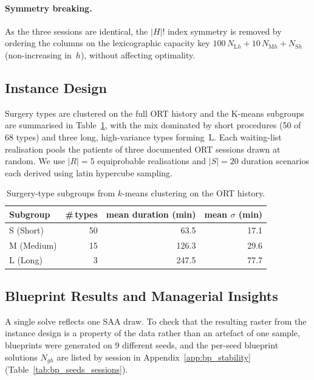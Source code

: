 \paragraph{Symmetry breaking.}
As the three sessions are identical, the $|H|!$ index symmetry is removed by
ordering the columns on the lexicographic capacity key
$100\,N_{\mathrm{L}h} + 10\,N_{\mathrm{M}h} + N_{\mathrm{S}h}$ (non-increasing
in~$h$), without affecting
optimality.

\subsection{Instance Design}
\label{sec:bp_instance}
Surgery types are clustered on the full ORT history
and the K-means subgroups are summarised in
Table~\ref{tab:bp_clusters}, with the mix dominated by short procedures (50 of
68 types) and three long, high-variance types forming~L. Each waiting-list
realisation pools the patients of three documented ORT sessions drawn at random. We use $|R| = 5$ equiprobable
realisations and $|S| = 20$ duration scenarios each derived using latin hypercube sampling.

\begin{table}[h]
  \centering
  \caption{Surgery-type subgroups from $k$-means clustering on the ORT history.}
  \label{tab:bp_clusters}
  \begin{tabular}{lrrr}
    \toprule
    Subgroup & \#\,types & mean duration (min) & mean $\sigma$ (min) \\
    \midrule
    S (Short)  & 50 &  63.5 & 17.1 \\
    M (Medium) & 15 & 126.3 & 29.6 \\
    L (Long)   &  3 & 247.5 & 77.7 \\
    \bottomrule
  \end{tabular}
\end{table}

\subsection{Blueprint Results and Managerial Insights}
\label{sec:bp_results}

A single solve reflects one SAA draw. To check that the resulting raster from the instance design is a
property of the data rather than an artefact of one sample, blueprints were generated on 9 different seeds, and the per-seed blueprint solutions $N_{gh}$ are listed by session in Appendix~\ref{app:bp_stability} (Table~\ref{tab:bp_seeds_sessions}).

